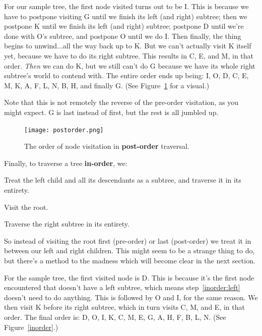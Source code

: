 For our sample tree, the first node visited turns out to be I. This is
because we have to postpone visiting G until we finish its left (and right)
subtree; then we postpone K until we finish its left (and right) subtree;
postpone D until we're done with O's subtree, and postpone O until we do I.
Then finally, the thing begins to unwind...all the way back up to K. But we
can't actually visit K itself yet, because we have to do its right subtree.
This results in C, E, and M, in that order. \textit{Then} we can do K, but
we still can't do G because we have its whole right subtree's world to
contend with. The entire order ends up being: I, O, D, C, E, M, K, A, F, L,
N, B, H, and finally G. (See Figure~\ref{postorder} for a visual.) 

Note that this is not remotely the reverse of the pre-order visitation, as
you might expect. G is last instead of first, but the rest is all jumbled
up. 

\begin{figure}[ht]
\centering
\texttt{[image: postorder.png]}
\caption{The order of node visitation in \textbf{post-order} traversal.}
\label{postorder}
\end{figure}


\begin{framed}
Finally, to traverse a tree \textbf{in-order}, we:
\begin{compactenum}
\item \label{inorder:left} Treat the left child and all its descendants as
a subtree, and traverse it in its entirety.
\item Visit the root.
\item Traverse the right subtree in its entirety.
\end{compactenum}
\end{framed}

So instead of visiting the root first (pre-order) or last (post-order) we
treat it in between our left and right children. This might seem to be a
strange thing to do, but there's a method to the madness which will become
clear in the next section.

For the sample tree, the first visited node is D. This is because it's the
first node encountered that doesn't have a left subtree, which means
step~\ref{inorder:left} doesn't need to do anything. This is followed by O
and I, for the same reason. We then visit K before its right subtree, which
in turn visits C, M, and E, in that order. The final order is: D, O, I, K,
C, M, E, G, A, H, F, B, L, N. (See Figure~\ref{inorder}.)

